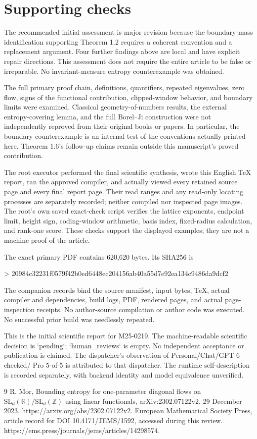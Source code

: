 \documentclass[10pt]{article}
\begin{document}
\section*{Supporting checks}
The recommended initial assessment is major revision because the boundary-mass identification supporting Theorem 1.2 requires a coherent convention and a replacement argument. Four further findings above are local and have explicit repair directions. This assessment does not require the entire article to be false or irreparable. No invariant-measure entropy counterexample was obtained.\par
The full primary proof chain, definitions, quantifiers, repeated eigenvalues, zero flow, signs of the functional contribution, clipped-window behavior, and boundary limits were examined. Classical geometry-of-numbers results, the external entropy-covering lemma, and the full Borel–Ji construction were not independently reproved from their original books or papers. In particular, the boundary counterexample is an internal test of the conventions actually printed here. Theorem 1.6’s follow-up claims remain outside this manuscript’s proved contribution.\par
The root executor performed the final scientific synthesis, wrote this English TeX report, ran the approved compiler, and actually viewed every retained source page and every final report page. Their read ranges and any read-only locating processes are separately recorded; neither compiled nor inspected page images. The root’s own saved exact-check script verifies the lattice exponents, endpoint limit, height sign, coding-window arithmetic, basis index, fixed-radius calculation, and rank-one score. These checks support the displayed examples; they are not a machine proof of the article.\par
The exact primary PDF contains 620,620 bytes. Its SHA256 is\par
> 20984c32231f0579f42b0ed6448ec204156ab40a55d7e92ea134c9486da9dcf2\par
The companion records bind the source manifest, input bytes, TeX, actual compiler and dependencies, build logs, PDF, rendered pages, and actual page-inspection receipts. No author-source compilation or author code was executed. No successful prior build was needlessly repeated.\par
This is the initial scientific report for M25-0219. The machine-readable scientific decision is `pending`; `human\_reviews` is empty. No independent acceptance or publication is claimed. The dispatcher’s observation of Personal/Chat/GPT-6 checked/ Pro 5-of-5 is attributed to that dispatcher. The runtime self-description is recorded separately, with backend identity and model equivalence unverified.\par
9 R. Mor, Bounding entropy for one-parameter diagonal flows on \(\mathrm{SL}_d(\mathbb R)/\mathrm{SL}_d(\mathbb Z)\) using linear functionals, arXiv:2302.07122v2, 29 December 2023. https://arxiv.org/abs/2302.07122v2. European Mathematical Society Press, article record for DOI 10.4171/JEMS/1592, accessed during this review. https://ems.press/journals/jems/articles/14298574.\par
\end{document}
